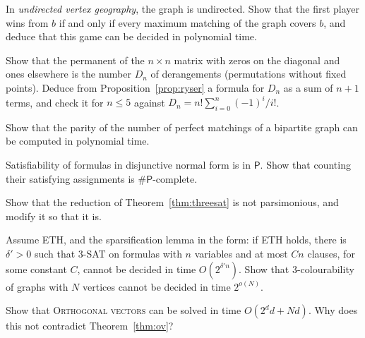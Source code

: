 \begin{exercise}[$\star\star\star$]\label{ex:undirectedgeo}
In \emph{undirected vertex geography}, the graph is undirected. Show that the first player wins from $b$ if and only if every maximum matching of the graph covers $b$, and deduce that this game can be decided in polynomial time.
\end{exercise}

\begin{exercise}[$\star$]\label{ex:permallones}
Show that the permanent of the $n\times n$ matrix with zeros on the diagonal and ones elsewhere is the number $D_n$ of derangements (permutations without fixed points). Deduce from Proposition~\ref{prop:ryser} a formula for $D_n$ as a sum of $n+1$ terms, and check it for $n\le5$ against $D_n=n!\sum_{i=0}^n(-1)^i/i!$.
\end{exercise}

\begin{exercise}[$\star$]\label{ex:permmod2}
Show that the parity of the number of perfect matchings of a bipartite graph can be computed in polynomial time.
\end{exercise}

\begin{exercise}[$\star$]\label{ex:sharpdnf}
Satisfiability of formulas in disjunctive normal form is in $\mathsf P$. Show that counting their satisfying assignments is $\#\mathsf P$-complete.
\end{exercise}

\begin{exercise}[$\star\star$]\label{ex:parsimonious}
Show that the reduction of Theorem~\ref{thm:threesat} is not parsimonious, and modify it so that it is.
\end{exercise}

\begin{exercise}[$\star$]\label{ex:ethcolouring}
Assume ETH, and the sparsification lemma in the form: if ETH holds, there is $\delta'>0$ such that 3-SAT on formulas with $n$ variables and at most $Cn$ clauses, for some constant $C$, cannot be decided in time $O(2^{\delta'n})$. Show that $3$-colourability of graphs with $N$ vertices cannot be decided in time $2^{o(N)}$.
\end{exercise}

\begin{exercise}[$\star$]\label{ex:ovsmall}
Show that \textup{\textsc{Orthogonal vectors}} can be solved in time $O(2^dd+Nd)$. Why does this not contradict Theorem~\ref{thm:ov}?
\end{exercise}


